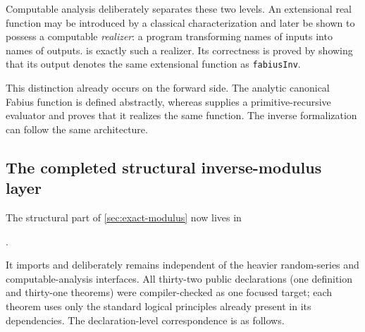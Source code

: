 \documentclass[11pt,oneside]{article}
\theoremstyle{definition}
\theoremstyle{remark}
\numberwithin{equation}{section}
\begin{document}
Computable analysis deliberately separates these two levels.  An extensional
real function may be introduced by a classical characterization and later be
shown to possess a computable \emph{realizer}: a program transforming names of
inputs into names of outputs.   is exactly such a
realizer.  Its correctness is proved by showing that its output denotes the
same extensional function as \texttt{fabiusInv}.

This distinction already occurs on the forward side.  The analytic canonical
Fabius function is defined abstractly, whereas
 supplies a primitive-recursive evaluator
and proves that it realizes the same function.  The inverse formalization can
follow the same architecture.

\subsection{The completed structural inverse-modulus layer}

The structural part of \cref{sec:exact-modulus} now lives in
\begin{center}
.
\end{center}
It imports  and deliberately remains independent of
the heavier random-series and computable-analysis interfaces.  All thirty-two
public declarations (one definition and thirty-one theorems) were
compiler-checked as one focused target; each theorem uses only the standard
logical principles already present in its dependencies.  The declaration-level
correspondence is as follows.
\end{document}
